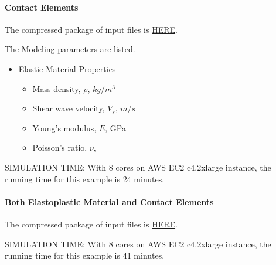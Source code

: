 \paragraph{Contact Elements}
The compressed package of input files is  
\href{https://github.com/yuan-energy/Real-ESSI-Short-Course-Examples/tree/master/short-course-examples/nonlinear_analysis_steps/soil-foundation/contact/contact.tgz?raw=true}{HERE}. 


The Modeling parameters are listed.
\begin{itemize}
  \item Elastic Material Properties 
  \begin{itemize}
    \item Mass density, $\rho$, \enspace {} $kg/m^3$
    \item Shear wave velocity, $V_s$, \enspace {} $m/s$
    \item Young's modulus, $E$, \enspace {} GPa
    \item Poisson's ratio, $\nu$, \enspace {}
  \end{itemize}
\end{itemize}

SIMULATION TIME: With 8 cores on AWS EC2 c4.2xlarge instance, the running time for this example is 24 minutes.

\paragraph{Both Elastoplastic Material and Contact Elements}
The compressed package of input files is  
\href{https://github.com/yuan-energy/Real-ESSI-Short-Course-Examples/tree/master/short-course-examples/nonlinear_analysis_steps/soil-foundation/both_plastic_contact/both_plastic_contact.tgz?raw=true}{HERE}. 

SIMULATION TIME: With 8 cores on AWS EC2 c4.2xlarge instance, the running time for this example is 41 minutes.




